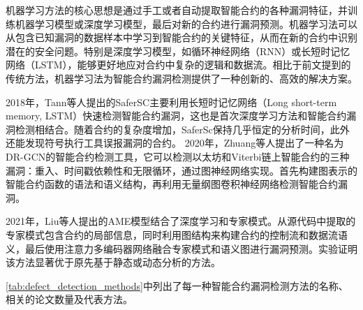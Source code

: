     机器学习方法的核心思想是通过手工或者自动提取智能合约的各种漏洞特征，并训练机器学习模型或深度学习模型，最后对新的合约进行漏洞预测。机器学习法可以从包含已知漏洞的数据样本中学习到智能合约的关键特征，从而在新的合约中识别潜在的安全问题。特别是深度学习模型，如循环神经网络（RNN）或长短时记忆网络（LSTM），能够更好地应对合约中复杂的逻辑和数据流。相比于前文提到的传统方法，机器学习法为智能合约漏洞检测提供了一种创新的、高效的解决方案\cite{xuejialei}。

    2018年，Tann等人提出的SaferSC\cite{tann2018towards}主要利用长短时记忆网络（Long short-term memory, LSTM）快速检测智能合约漏洞，这也是首次深度学习方法和智能合约漏洞检测相结合。随着合约的复杂度增加，SaferSc保持几乎恒定的分析时间，此外还能发现符号执行工具误报漏洞的合约。
    2020年，Zhuang等人提出了一种名为DR-GCN\cite{zhuang2021smart}的智能合约检测工具，它可以检测以太坊和Viterbi链上智能合约的三种漏洞：重入、时间戳依赖性和无限循环，通过图神经网络实现。首先构建图表示的智能合约函数的语法和语义结构，再利用无量纲图卷积神经网络检测智能合约漏洞。
    
    2021年，Liu等人提出的AME\cite{liu2021smart}模型结合了深度学习和专家模式。从源代码中提取的专家模式包含合约的局部信息，同时利用图结构来构建合约的控制流和数据流语义，最后使用注意力多编码器网络融合专家模式和语义图进行漏洞预测。实验证明该方法显著优于原先基于静态或动态分析的方法。



\autoref{tab:defect_detection_methods}中列出了每一种智能合约漏洞检测方法的名称、相关的论文数量及代表方法。

